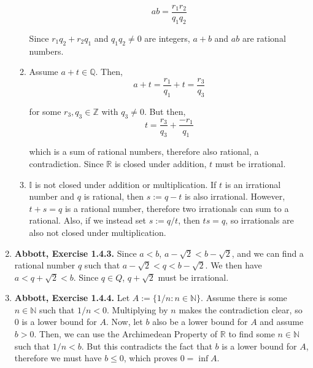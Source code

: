 \documentclass{article}
\newcommand{\N}{\mathbb{N}}
\newcommand{\Z}{\mathbb{Z}}
\newcommand{\Q}{\mathbb{Q}}
\newcommand{\R}{\mathbb{R}}
\newcommand{\exc}[2][Abbott]{\item \textbf{#1, Exercise #2.}}
\begin{document}
\begin{enumerate}
\begin{enumerate}
		\begin{equation*}
			ab = \frac{r_1 r_2}{q_1 q_2}
		\end{equation*}
							      		      	      
		Since $r_1 q_2 + r_2 q_1$ and $q_1 q_2 \neq 0$ are integers, $a+b$ and $ab$ are rational numbers.
							      		      	      
		\item Assume $a + t \in \Q$. Then, 
		      \begin{equation*}
		      	a + t = \frac{r_1}{q_1} + t = \frac{r_3}{q_3}
		      \end{equation*}
		      		      		      	      	      	      	            
		      for some $r_3, q_3 \in \Z$ with $q_3 \neq 0$. But then,
		      \begin{equation*}
		      	t = \frac{r_3}{q_3} +  \frac{-r_1}{q_1}
		      \end{equation*}
		      		      		      	      	      	      	            
		      which is a sum of rational numbers, therefore also rational, a contradiction. Since $\R$ is closed under addition, $t$ must be irrational.
		      		      		      	      	      	      	            
		\item $\mathbb{I}$ is not closed under addition or multiplication. If $t$ is an irrational number and $q$ is rational, then $s := q-t$ is also irrational. However, $t + s = q$ is a rational number, therefore two irrationals can sum to a rational. Also, if we instead set $s := q/t$, then $t s = q$, so irrationals are also not closed under multiplication.
	\end{enumerate}
				      	        
	\exc{1.4.3}
	Since $a < b$, $a - \sqrt{2} < b - \sqrt{2}$, and we can find a rational number $q$ such that $a - \sqrt{2} < q < b - \sqrt{2}$. We then have $a < q + \sqrt{2} < b$. Since $q \in Q$, $q + \sqrt{2}$ must be irrational.
				      	      
	\exc{1.4.4}
	Let $A := \{1/n : n \in \N\}$.
	Assume there is some $n \in \N$ such that $1/n < 0$. Multiplying by $n$ makes the contradiction clear, so $0$ is a lower bound for $A$. Now, let $b$  also be a lower bound for $A$ and assume $b > 0$. Then, we can use the Archimedean Property of $\R$ to find some $n \in \N$ such that $1/n < b$. But this contradicts the fact that $b$ is a lower bound for $A$, therefore we must have $b \leq 0$, which proves $0 = \inf A$.
				      	        

\end{enumerate}
\end{document}
